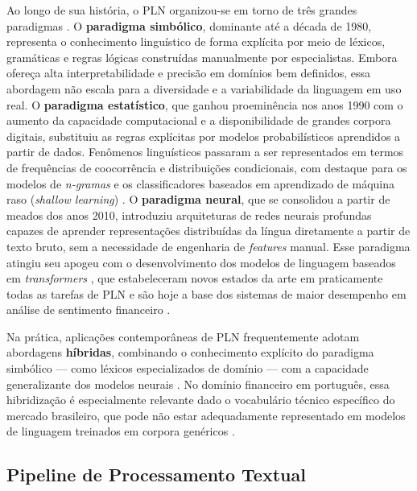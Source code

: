 Ao longo de sua história, o PLN organizou-se em torno de três grandes paradigmas \cite{caseli2024cap1}. O \textbf{paradigma simbólico}, dominante até a década de 1980, representa o conhecimento linguístico de forma explícita por meio de léxicos, gramáticas e regras lógicas construídas manualmente por especialistas. Embora ofereça alta interpretabilidade e precisão em domínios bem definidos, essa abordagem não escala para a diversidade e a variabilidade da linguagem em uso real. O \textbf{paradigma estatístico}, que ganhou proeminência nos anos 1990 com o aumento da capacidade computacional e a disponibilidade de grandes corpora digitais, substituiu as regras explícitas por modelos probabilísticos aprendidos a partir de dados. Fenômenos linguísticos passaram a ser representados em termos de frequências de coocorrência e distribuições condicionais, com destaque para os modelos de \textit{n-gramas} e os classificadores baseados em aprendizado de máquina raso (\textit{shallow learning}) \cite{jurafsky2026}. O \textbf{paradigma neural}, que se consolidou a partir de meados dos anos 2010, introduziu arquiteturas de redes neurais profundas capazes de aprender representações distribuídas da língua diretamente a partir de texto bruto, sem a necessidade de engenharia de \textit{features} manual. Esse paradigma atingiu seu apogeu com o desenvolvimento dos modelos de linguagem baseados em \textit{transformers}
\cite{jurafsky2026}, que estabeleceram novos estados da arte em praticamente todas as tarefas de PLN e são hoje a base dos sistemas de maior desempenho em análise de sentimento financeiro \cite{santos2023finbert}.

Na prática, aplicações contemporâneas de PLN frequentemente adotam abordagens \textbf{híbridas}, combinando o conhecimento explícito do paradigma simbólico --- como léxicos especializados de domínio --- com a capacidade generalizante dos modelos neurais \cite{caseli2024cap1,kearney2014}. No domínio financeiro em português, essa hibridização é especialmente relevante dado o vocabulário técnico específico do mercado brasileiro, que pode não estar adequadamente representado em modelos de linguagem treinados em corpora genéricos \cite{sousa2025,santos2023finbert}.


\subsection{Pipeline de Processamento Textual}
\label{subsec:pln_pipeline}

